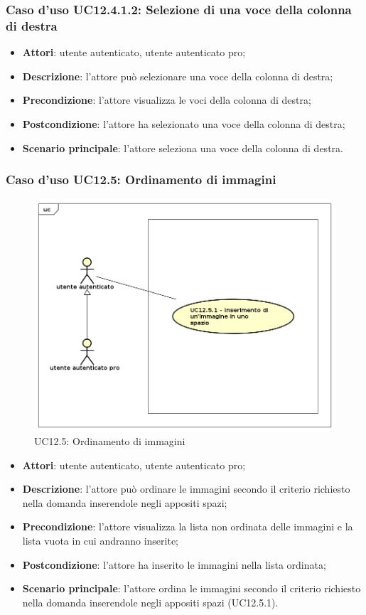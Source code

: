\subsubsection{Caso d'uso UC12.4.1.2: Selezione di una voce della colonna di destra}
\begin{itemize}
\item \textbf{Attori}: utente autenticato, utente autenticato pro;
\item \textbf{Descrizione}: l'attore può selezionare una voce della colonna di destra;
\item \textbf{Precondizione}: l'attore visualizza le voci della colonna di destra;
\item \textbf{Postcondizione}: l'attore ha selezionato una voce della colonna di destra;
\item \textbf{Scenario principale}: l'attore seleziona una voce della colonna di destra. 
\end{itemize}

\subsubsection{Caso d'uso UC12.5: Ordinamento di immagini}
\label{UC12.5}
\begin{figure}[h]
	\centering
	\includegraphics[scale=0.5]{UML/UC12_5.png}
	\caption{UC12.5: Ordinamento di immagini}
\end{figure}
\begin{itemize}
\item \textbf{Attori}: utente autenticato, utente autenticato pro;
\item \textbf{Descrizione}: l'attore può ordinare le immagini secondo il criterio richiesto nella domanda inserendole negli appositi spazi;
\item \textbf{Precondizione}: l'attore visualizza la lista non ordinata delle immagini e la lista vuota in cui andranno inserite;
\item \textbf{Postcondizione}: l'attore ha inserito le immagini nella lista ordinata;
\item \textbf{Scenario principale}: l'attore ordina le immagini secondo il criterio richiesto nella domanda inserendole negli appositi spazi (UC12.5.1).
\end{itemize}

